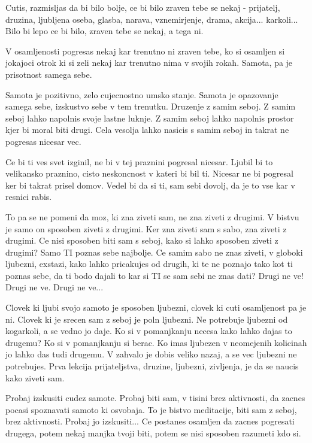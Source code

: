 Cutis, razmisljas da bi bilo bolje, ce bi bilo zraven tebe se nekaj - prijatelj, druzina, ljubljena oseba, glasba, narava, vznemirjenje, drama, akcija... karkoli... Bilo bi lepo ce bi bilo, zraven tebe se nekaj, a tega ni. 

V osamljenosti pogresas nekaj kar trenutno ni zraven tebe, ko si osamljen si jokajoci otrok ki si zeli nekaj kar trenutno nima v svojih rokah. Samota, pa je prisotnost samega sebe. 

Samota je pozitivno, zelo cujecnostno umsko stanje. Samota je opazovanje samega sebe, izskustvo sebe v tem trenutku. Druzenje z samim seboj.  Z samim seboj lahko napolnis svoje lastne luknje. Z samim seboj lahko napolnis prostor kjer bi moral biti drugi. Cela vesolja lahko nasicis s samim seboj in takrat ne pogresas nicesar vec. 

Ce bi ti ves svet izginil, ne bi v tej praznini pogresal nicesar.  Ljubil bi to velikansko praznino, cisto neskoncnost v kateri bi bil ti. Nicesar ne bi pogresal ker bi takrat prisel domov. Vedel bi da si ti, sam sebi dovolj, da je to vse kar v resnici rabis. 

To pa se ne pomeni da moz, ki zna ziveti sam, ne zna ziveti z drugimi. V bistvu je samo on sposoben ziveti z drugimi. Ker zna ziveti sam s sabo, zna ziveti z drugimi. Ce nisi sposoben biti sam s seboj, kako si lahko sposoben ziveti z drugimi? Samo TI poznas sebe najbolje. Ce samim sabo ne znas ziveti, v globoki ljubezni, exstazi, kako lahko pricakujes od drugih, ki te ne poznajo tako kot ti poznas sebe, da ti bodo dajali to kar si TI se sam sebi ne znas dati? Drugi ne ve! Drugi ne ve. Drugi ne ve... 

Clovek ki ljubi svojo samoto je sposoben ljubezni, clovek ki cuti osamljenost pa je ni. Clovek ki je srecen sam z seboj je poln ljubezni. Ne potrebuje ljubezni od kogarkoli, a se vedno jo daje. Ko si v pomanjkanju necesa kako lahko dajas to drugemu? Ko si v pomanjkanju si berac. Ko imas ljubezen v neomejenih kolicinah jo lahko das tudi drugemu. V zahvalo je dobis veliko nazaj, a se vec ljubezni ne potrebujes.  Prva lekcija prijateljstva, druzine, ljubezni, zivljenja, je da se naucis kako ziveti sam. 

Probaj izskusiti cudez samote. Probaj biti sam, v tisini brez aktivnosti, da zacnes pocasi spoznavati samoto ki osvobaja. To je bistvo meditacije, biti sam z seboj, brez aktivnosti. Probaj jo izskusiti... Ce postanes osamljen da zacnes pogresati drugega, potem nekaj manjka tvoji biti, potem se nisi sposoben razumeti kdo si. 

